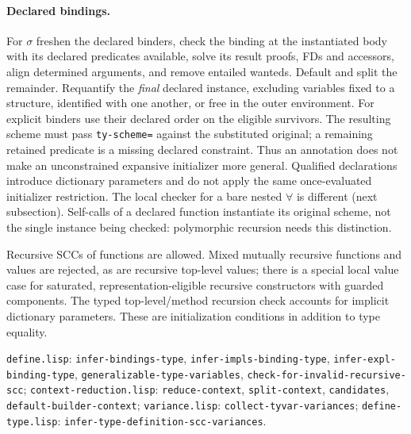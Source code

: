\documentclass[11pt]{article}
\theoremstyle{definition}
\newcommand{\src}[1]{\nolinkurl{#1}}
\begin{document}
\paragraph{Declared bindings.}
For $\sigma$ freshen the declared binders, check the binding at the
instantiated body with its declared predicates available, solve its result
proofs, FDs and accessors, align determined arguments, and remove
entailed wanteds. Default and split the remainder. Requantify the
\emph{final} declared instance, excluding variables fixed to a structure,
identified with one another, or free in the outer environment. For explicit
binders use their declared order on the eligible survivors. The resulting
scheme must pass \src{ty-scheme=} against the substituted original; a
remaining retained predicate is a missing declared constraint. Thus an
annotation does not make an unconstrained expansive initializer more
general. Qualified declarations introduce dictionary parameters and do
not apply the same once-evaluated initializer restriction. The local
checker for a bare nested $\forall$ is different (next subsection).
Self-calls of a declared function instantiate its original scheme, not the
single instance being checked: polymorphic recursion needs this distinction.

Recursive SCCs of functions are allowed. Mixed mutually recursive functions
and values are rejected, as are recursive top-level values; there is a
special local value case for saturated, representation-eligible recursive
constructors with guarded components. The typed top-level/method recursion
check accounts for implicit dictionary parameters. These are initialization
conditions in addition to type equality.

\sources \src{define.lisp}: \src{infer-bindings-type},
\src{infer-impls-binding-type}, \src{infer-expl-binding-type},
\src{generalizable-type-variables}, \src{check-for-invalid-recursive-scc};
\src{context-reduction.lisp}: \src{reduce-context}, \src{split-context},
\src{candidates}, \src{default-builder-context}; \src{variance.lisp}:
\src{collect-tyvar-variances}; \src{define-type.lisp}:
\src{infer-type-definition-scc-variances}.
\end{document}
